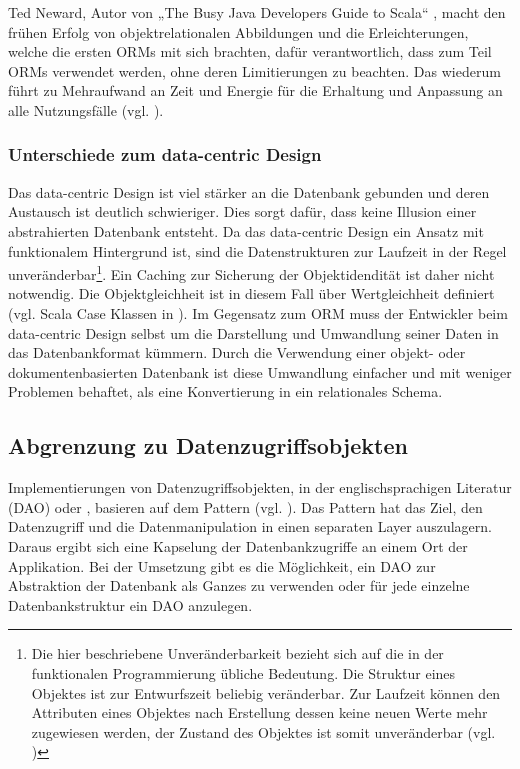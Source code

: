 Ted Neward, Autor von „The Busy Java Developers Guide to Scala“ \cite{busy-to-scala}, macht den frühen Erfolg von objektrelationalen Abbildungen und die Erleichterungen, welche die ersten ORMs mit sich brachten, dafür verantwortlich, dass zum Teil ORMs verwendet werden, ohne deren Limitierungen zu beachten. Das wiederum führt zu Mehraufwand an Zeit und Energie für die Erhaltung und Anpassung an alle Nutzungsfälle (vgl. \cite{vietnam}).

\subsubsection{Unterschiede zum data-centric Design}
Das data-centric Design ist viel stärker an die Datenbank gebunden und deren Austausch ist deutlich schwieriger. Dies sorgt dafür, dass keine Illusion einer abstrahierten Datenbank entsteht. Da das data-centric Design ein Ansatz mit funktionalem Hintergrund ist, sind die Datenstrukturen zur Laufzeit in der Regel unveränderbar\footnote{Die hier beschriebene Unveränderbarkeit bezieht sich auf die in der funktionalen Programmierung übliche Bedeutung. Die Struktur eines Objektes ist zur Entwurfszeit beliebig veränderbar. Zur Laufzeit können den Attributen eines Objektes nach Erstellung dessen keine neuen Werte mehr zugewiesen werden, der Zustand des Objektes ist somit unveränderbar (vgl. \cite[p.~181]{programmieren-in-scala})}. Ein Caching zur Sicherung der Objektidendität ist daher nicht notwendig. Die Objektgleichheit ist in diesem Fall über Wertgleichheit definiert (vgl. Scala Case Klassen in \cite{scala-case-class}). Im Gegensatz zum ORM muss der Entwickler beim data-centric Design selbst um die Darstellung und Umwandlung seiner Daten in das Datenbankformat kümmern. Durch die Verwendung einer objekt- oder dokumentenbasierten Datenbank ist diese Umwandlung einfacher und mit weniger Problemen behaftet, als eine Konvertierung in ein relationales Schema.

\subsection{Abgrenzung zu Datenzugriffsobjekten}
Implementierungen von Datenzugriffsobjekten, in der englischsprachigen Literatur  (DAO) oder , basieren auf dem  Pattern (vgl. \cite{j2ee-pattern}).  Das Pattern hat das Ziel, den Datenzugriff und die Datenmanipulation in einen separaten Layer auszulagern. Daraus ergibt sich eine Kapselung der Datenbankzugriffe an einem Ort der Applikation. Bei der Umsetzung gibt es die Möglichkeit, ein DAO zur Abstraktion der Datenbank als Ganzes zu verwenden oder für jede einzelne Datenbankstruktur ein DAO anzulegen.

